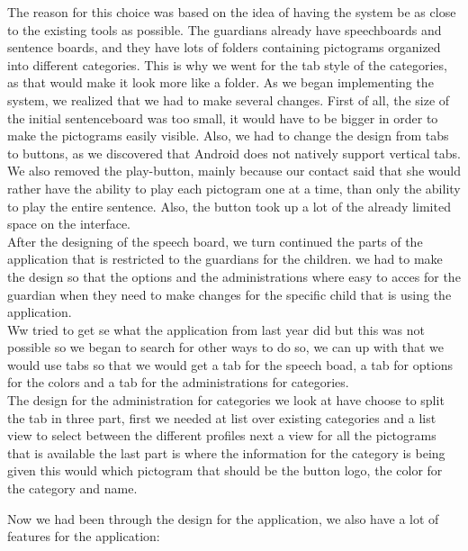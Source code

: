 The reason for this choice was based on the idea of having the system be as close to the existing tools as possible. The guardians already have speechboards and sentence boards, and they have lots of folders containing pictograms organized into different categories. This is why we went for the tab style of the categories, as that would make it look more like a folder.\newline
As we began implementing the system, we realized that we had to make several changes. First of all, the size of the initial sentenceboard was too small, it would have to be bigger in order to make the pictograms easily visible. Also, we had to change the design from tabs to buttons, as we discovered that Android does not natively support vertical tabs. We also removed the play-button, mainly because our contact said that she would rather have the ability to play each pictogram one at a time, than only the ability to play the entire sentence. Also, the button took up a lot of the already limited space on the interface.\newline
\\
After the designing of the speech board, we turn continued the parts of the application that is restricted to the guardians for the children. we had to make the design so that the options and the administrations where easy to acces for the guardian when they need to make changes for the specific child that is using the application. 
\\
Ww tried to get se what the application from last year did but this was not possible so we began to search for other ways to do so, we can up with that we would use tabs so that we would get a tab for the speech boad, a tab for options for the colors and a tab for the administrations for categories.\\

The design for the administration for categories we look at have choose to split the tab in three part, first we needed at list over existing categories and a list view to select between the different profiles next a view for all the pictograms that is available the last part is where the information for the category is being given this would which pictogram that should be the button logo, the color for the category and name.  

Now we had been through the design for the application, we also have a lot of features for the application: 


